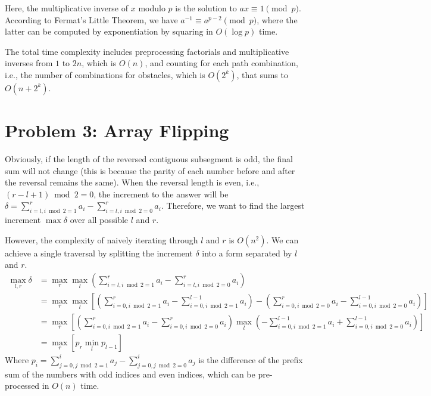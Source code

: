 \documentclass[11pt, a4paper, oneside]{memoir}
\begin{document}
Here, the multiplicative inverse of $x$ modulo $p$ is the solution to $ax \equiv 1 \pmod{p}$.
According to Fermat's Little Theorem, we have $a^{-1} \equiv a^{p-2} \pmod{p}$,
where the latter can be computed by exponentiation by squaring in $O(\log p)$ time.

The total time complexity includes preprocessing factorials and multiplicative inverses from $1$ to $2n$, which is $O(n)$,
and counting for each path combination, i.e., the number of combinations for obstacles, which is $O(2^k)$, that sums to $O(n+2^k)$.

\chapter{Problem 3: Array Flipping}
Obviously, if the length of the reversed contiguous subsegment is odd,
the final sum will not change (this is because the parity of each number before and after the reversal remains the same).
When the reversal length is even, i.e., $(r-l+1) \bmod 2= 0$, the increment to the answer will be $\delta = \sum_{i=l, i \bmod 2=1}^r a_i - \sum_{i=l, i \bmod 2=0}^r a_i$.
Therefore, we want to find the largest increment $\max{\delta}$ over all possible $l$ and $r$.

However, the complexity of naively iterating through $l$ and $r$ is $O(n^2)$. We can achieve a single traversal by splitting the increment $\delta$ into a form separated by $l$ and $r$.
\begin{align*}
  \max_{l, r} \delta & = \max_{r} \max_{l} \left( \sum_{i=l, i \bmod 2=1}^r a_i - \sum_{i=l, i \bmod 2=0}^r a_i \right)                                                                                                        \\
                     & = \max_{r} \max_{l}  \left[ \left( \sum_{i=0, i \bmod 2=1}^r a_i - \sum_{i=0, i \bmod 2=1}^{l-1} a_i \right) - \left( \sum_{i=0, i \bmod 2=0}^r a_i - \sum_{i=0, i \bmod 2=0}^{l-1} a_i \right) \right] \\
                     & = \max_{r} \left[ \left( \sum_{i=0, i \bmod 2=1}^r a_i - \sum_{i=0, i \bmod 2=0}^r a_i \right) \max_{l} \left( - \sum_{i=0, i \bmod 2=1}^{l-1} a_i + \sum_{i=0, i \bmod 2=0}^{l-1} a_i \right) \right]  \\
                     & = \max_{r} \left[ p_r \min_{l} p_{l-1} \right]
\end{align*}
Where $p_i = \sum_{j=0, j \bmod 2=1}^i a_j - \sum_{j=0, j \bmod 2=0}^i a_j$ is the difference of the prefix sum of the numbers with odd indices and even indices,
which can be pre-processed in $O(n)$ time.
\end{document}
